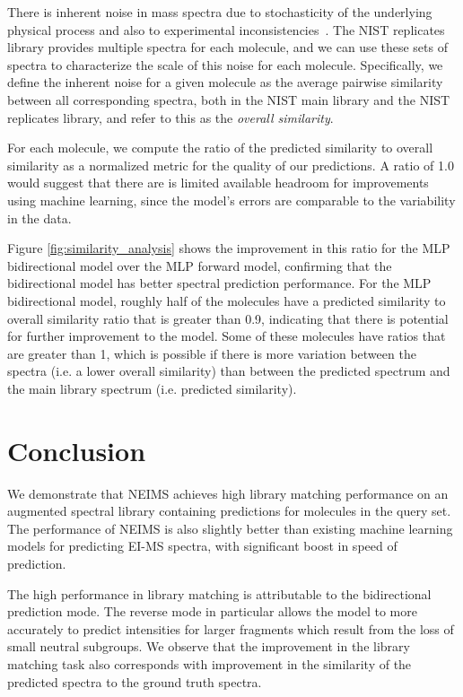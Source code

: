 \documentclass{article}
\begin{document}
There is inherent noise in mass spectra due to stochasticity of the underlying physical process and also to experimental inconsistencies~\cite{stein2012MassLibReview}. The NIST replicates library provides multiple spectra for each molecule, and we can use these sets of spectra to characterize the scale of this noise for each molecule. Specifically, we define the inherent noise for a given molecule as the average pairwise similarity between all corresponding spectra, both in the NIST main library and the NIST replicates library, and refer to this as the \textit{overall similarity}. 

For each molecule, we compute the ratio of the predicted similarity to overall similarity as a normalized metric for the quality of our predictions. A ratio of 1.0 would suggest that there are is limited available headroom for improvements using machine learning, since the model's errors are comparable to the variability in the data.

Figure \ref{fig:similarity_analysis} shows the improvement in this ratio for the MLP bidirectional model over the MLP forward model, confirming that the bidirectional model has better spectral prediction performance. For the MLP bidirectional model, roughly half of the molecules have a predicted similarity to overall similarity ratio that is greater than 0.9, indicating that there is potential for further improvement to the model. Some of these molecules have ratios that are greater than 1, which is possible if there is more variation between the spectra (i.e. a lower overall similarity) than between the predicted spectrum and the main library spectrum (i.e. predicted similarity).
\section{Conclusion}

We demonstrate that NEIMS achieves high library matching performance on an augmented spectral library containing predictions for molecules in the query set. 
The performance of NEIMS is also slightly better than existing machine learning models for predicting EI-MS spectra, with significant boost in speed of prediction.

The high performance in library matching is attributable to the bidirectional prediction mode. The reverse mode in particular allows the model to more accurately to predict intensities for larger fragments which result from the loss of small neutral subgroups. We observe that the improvement in the library matching task also corresponds with improvement in the similarity of the predicted spectra to the ground truth spectra.
\end{document}
